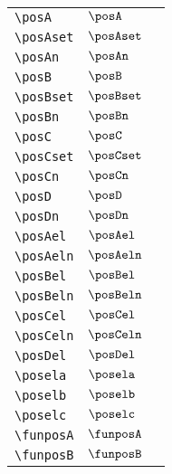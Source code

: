 \begin{longtable}{lll}
 \hline
{\color[rgb]{0.5,0.5,0.5}\texttt{\textbackslash posA}} & $\posA$ & \\ 
 {\color[rgb]{0.5,0.5,0.5}\texttt{\textbackslash posAset}} & $\posAset$ & \\ 
 {\color[rgb]{0.5,0.5,0.5}\texttt{\textbackslash posAn}} & $\posAn$ & \\ 
 {\color[rgb]{0.5,0.5,0.5}\texttt{\textbackslash posB}} & $\posB$ & \\ 
 {\color[rgb]{0.5,0.5,0.5}\texttt{\textbackslash posBset}} & $\posBset$ & \\ 
 {\color[rgb]{0.5,0.5,0.5}\texttt{\textbackslash posBn}} & $\posBn$ & \\ 
 {\color[rgb]{0.5,0.5,0.5}\texttt{\textbackslash posC}} & $\posC$ & \\ 
 {\color[rgb]{0.5,0.5,0.5}\texttt{\textbackslash posCset}} & $\posCset$ & \\ 
 {\color[rgb]{0.5,0.5,0.5}\texttt{\textbackslash posCn}} & $\posCn$ & \\ 
 {\color[rgb]{0.5,0.5,0.5}\texttt{\textbackslash posD}} & $\posD$ & \\ 
 {\color[rgb]{0.5,0.5,0.5}\texttt{\textbackslash posDn}} & $\posDn$ & \\ 
 {\color[rgb]{0.5,0.5,0.5}\texttt{\textbackslash posAel}} & $\posAel$ & \\ 
 {\color[rgb]{0.5,0.5,0.5}\texttt{\textbackslash posAeln}} & $\posAeln$ & \\ 
 {\color[rgb]{0.5,0.5,0.5}\texttt{\textbackslash posBel}} & $\posBel$ & \\ 
 {\color[rgb]{0.5,0.5,0.5}\texttt{\textbackslash posBeln}} & $\posBeln$ & \\ 
 {\color[rgb]{0.5,0.5,0.5}\texttt{\textbackslash posCel}} & $\posCel$ & \\ 
 {\color[rgb]{0.5,0.5,0.5}\texttt{\textbackslash posCeln}} & $\posCeln$ & \\ 
 {\color[rgb]{0.5,0.5,0.5}\texttt{\textbackslash posDel}} & $\posDel$ & \\ 
 {\color[rgb]{0.5,0.5,0.5}\texttt{\textbackslash posela}} & $\posela$ & \\ 
 {\color[rgb]{0.5,0.5,0.5}\texttt{\textbackslash poselb}} & $\poselb$ & \\ 
 {\color[rgb]{0.5,0.5,0.5}\texttt{\textbackslash poselc}} & $\poselc$ & \\ 
 {\color[rgb]{0.5,0.5,0.5}\texttt{\textbackslash funposA}} & $\funposA$ & \\ 
 {\color[rgb]{0.5,0.5,0.5}\texttt{\textbackslash funposB}} & $\funposB$ & \\ 

\end{longtable}
